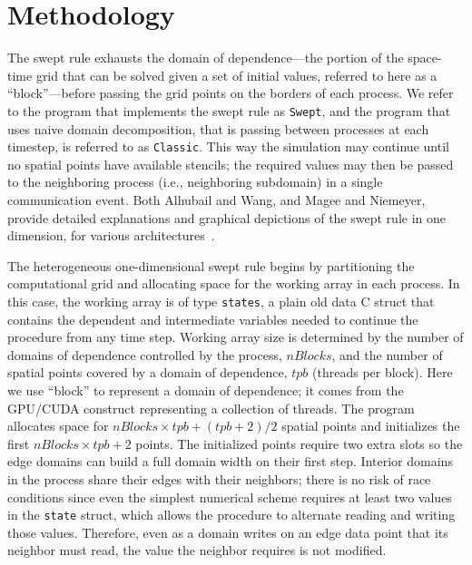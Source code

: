 
\section{Methodology} \label{sec:hMethods}


The swept rule exhausts the domain of dependence---the portion of the space-time grid that can be solved given a set of initial values, referred to here as a ``block''---before passing the grid points on the borders of each process.
We refer to the program that implements the swept rule as \texttt{Swept}, and the program that uses naive domain decomposition, that is passing between processes at each timestep, is referred to as \texttt{Classic}.
This way the simulation may continue until no spatial points have available stencils; the required values may then be passed to the neighboring process (i.e., neighboring subdomain) in a single communication event.
Both Alhubail and Wang, and Magee and Niemeyer, provide detailed explanations and graphical depictions
of the swept rule in one dimension, for various architectures~\cite{alhubail:16jcp, OurJCP}.

The heterogeneous one-dimensional swept rule begins by partitioning the computational grid and
allocating space for the working array in each process.
In this case, the working array is of type \texttt{states}, a plain old data C struct that contains the
dependent and intermediate variables needed to continue the procedure from any time step.
Working array size is determined by the number of domains of dependence controlled by the process,
$nBlocks$, and the number of spatial points covered by a domain of dependence, $tpb$ (threads per block).
Here we use ``block'' to represent a domain of dependence; it comes from the GPU\slash CUDA
construct representing a collection of threads.
The program allocates space for $nBlocks \times tpb + (tpb+2)/2$ spatial points and initializes the
first $nBlocks \times tpb + 2$ points.
The initialized points require two extra slots so the edge domains
can build a full domain width on their first step.
Interior domains in the process share their edges with their neighbors; there is no risk of
race conditions since even the simplest numerical scheme requires at least two values in the
\texttt{state} struct, which allows the procedure to alternate reading and writing those values.
Therefore, even as a domain writes on an edge data point that its neighbor must read,
the value the neighbor requires is not modified.

